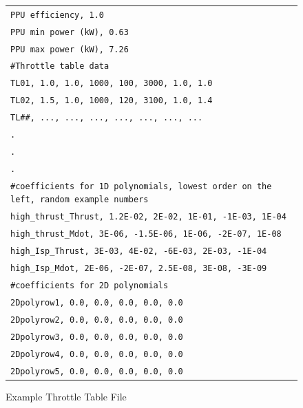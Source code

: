 \begin{figure}[H]
    \centering
    \begin{tabular}{|l|}
        \hline
        {\tt PPU efficiency, 1.0} \\
        {\tt PPU min power (kW), 0.63} \\
        {\tt PPU max power (kW), 7.26} \\
        {\tt \#Throttle table data} \\
        {\tt TL01, 1.0, 1.0, 1000, 100, 3000, 1.0, 1.0} \\
        {\tt TL02, 1.5, 1.0, 1000, 120, 3100, 1.0, 1.4} \\
        {\tt TL\#\#, ..., ..., \hspace{6pt}..., ..., \hspace{6pt}..., ...,  ...} \\
        {\tt \hspace{2pt}.} \\
        {\tt \hspace{2pt}.} \\
        {\tt \hspace{2pt}.} \\
        {\tt \#coefficients for 1D polynomials, lowest order on the left, random example numbers} \\
        {\tt high\_thrust\_Thrust, 1.2E-02, 2E-02, 1E-01, -1E-03, 1E-04} \\
        {\tt high\_thrust\_Mdot, 3E-06, -1.5E-06, 1E-06, -2E-07, 1E-08} \\
        {\tt high\_Isp\_Thrust, 3E-03, 4E-02, -6E-03, 2E-03, -1E-04} \\
        {\tt high\_Isp\_Mdot, 2E-06, -2E-07, 2.5E-08, 3E-08, -3E-09} \\
        {\tt \#coefficients for 2D polynomials} \\
        {\tt 2Dpolyrow1, 0.0, 0.0, 0.0, 0.0, 0.0} \\ 
        {\tt 2Dpolyrow2, 0.0, 0.0, 0.0, 0.0, 0.0} \\ 
        {\tt 2Dpolyrow3, 0.0, 0.0, 0.0, 0.0, 0.0} \\ 
        {\tt 2Dpolyrow4, 0.0, 0.0, 0.0, 0.0, 0.0} \\ 
        {\tt 2Dpolyrow5, 0.0, 0.0, 0.0, 0.0, 0.0} \\ 
        \hline
    \end{tabular}
    \caption{Example Throttle Table File}
    \label{fig:throttle_table}
\end{figure}

